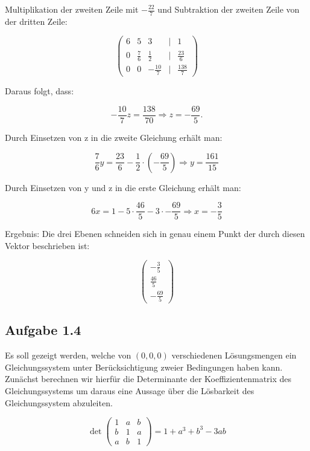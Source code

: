 \documentclass[11pt]{article}
\begin{document}
    Multiplikation der zweiten Zeile mit $-\frac{22}{7}$ und Subtraktion der zweiten Zeile von der dritten Zeile:

    \[
    \begin{pmatrix}
        6 & 5 & 3 & | & 1 \\
        0 & \frac{7}{6} & \frac{1}{2} & | & \frac{23}{6} \\
        0 & 0 & -\frac{10}{7} & | & \frac{138}{7}
    \end{pmatrix}
    \]

    Daraus folgt, dass:

    \[
    -\frac{10}{7}z = \frac{138}{70} \Rightarrow z= -\frac{69}{5}.
    \]

    Durch Einsetzen von z in die zweite Gleichung erhält man:

    \[
    \frac{7}{6}y = \frac{23}{6} - \frac{1}{2} \cdot \left(-\frac{69}{5}\right) \Rightarrow y = \frac{161}{15}
    \]

    Durch Einsetzen von y und z in die erste Gleichung erhält man:

    \[
    6x = 1 - 5 \cdot \frac{46}{5} - 3 \cdot -\frac{69}{5} \Rightarrow x = -\frac{3}{5}
    \]

    Ergebnis: Die drei Ebenen schneiden sich in genau einem Punkt der durch diesen Vektor beschrieben ist:

    \[
    \begin{pmatrix}
        -\frac{3}{5} \\
        \frac{46}{5} \\
        -\frac{69}{5}
    \end{pmatrix}
    \]

    \subsection{Aufgabe 1.4}

    Es soll gezeigt werden, welche von ${(0,0,0)}$ verschiedenen Lösungsmengen ein Gleichungssystem
    unter Berücksichtigung zweier Bedingungen haben kann. Zunächst berechnen wir hierfür die Determinante der Koeffizientenmatrix des Gleichungssystems um daraus eine
    Aussage über die Lösbarkeit des Gleichungssystem abzuleiten.

    \[
    \det\begin{pmatrix}
        1 & a & b \\
        b & 1 & a \\
        a & b & 1
    \end{pmatrix} = 1 + a^3 + b^3 - 3ab
    \]
\end{document}

